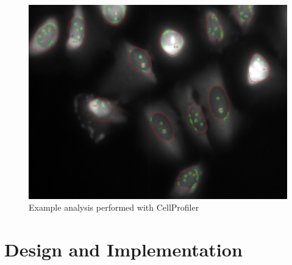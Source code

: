 \documentclass[a4paper, 11pt]{article}
\begin{document}
\begin{figure}[h]
    \includegraphics[width=\linewidth]{images/cellprofiler_channel1}
    \caption{Example analysis performed with CellProfiler}
    \label{fig:cellprofiler_example}
\end{figure}

\newpage
\section{Design and Implementation}
\end{document}
